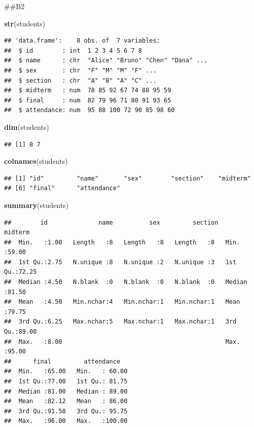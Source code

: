 \documentclass[
]{article}
\newenvironment{Shaded}{\begin{snugshade}}{\end{snugshade}}
\newcommand{\FunctionTok}[1]{\textcolor[rgb]{0.13,0.29,0.53}{\textbf{#1}}}
\newcommand{\NormalTok}[1]{#1}
\begin{document}
\#\#B2

\begin{Shaded}
\begin{Highlighting}[]
\FunctionTok{str}\NormalTok{(students)}
\end{Highlighting}
\end{Shaded}

\begin{verbatim}
## 'data.frame':    8 obs. of  7 variables:
##  $ id        : int  1 2 3 4 5 6 7 8
##  $ name      : chr  "Alice" "Bruno" "Chen" "Dana" ...
##  $ sex       : chr  "F" "M" "M" "F" ...
##  $ section   : chr  "A" "B" "A" "C" ...
##  $ midterm   : num  78 85 92 67 74 88 95 59
##  $ final     : num  82 79 96 71 80 91 93 65
##  $ attendance: num  95 88 100 72 90 85 98 60
\end{verbatim}

\begin{Shaded}
\begin{Highlighting}[]
\FunctionTok{dim}\NormalTok{(students)}
\end{Highlighting}
\end{Shaded}

\begin{verbatim}
## [1] 8 7
\end{verbatim}

\begin{Shaded}
\begin{Highlighting}[]
\FunctionTok{colnames}\NormalTok{(students)}
\end{Highlighting}
\end{Shaded}

\begin{verbatim}
## [1] "id"         "name"       "sex"        "section"    "midterm"   
## [6] "final"      "attendance"
\end{verbatim}

\begin{Shaded}
\begin{Highlighting}[]
\FunctionTok{summary}\NormalTok{(students)}
\end{Highlighting}
\end{Shaded}

\begin{verbatim}
##        id              name          sex         section     midterm     
##  Min.   :1.00   Length   :8   Length   :8   Length   :8   Min.   :59.00  
##  1st Qu.:2.75   N.unique :8   N.unique :2   N.unique :3   1st Qu.:72.25  
##  Median :4.50   N.blank  :0   N.blank  :0   N.blank  :0   Median :81.50  
##  Mean   :4.50   Min.nchar:4   Min.nchar:1   Min.nchar:1   Mean   :79.75  
##  3rd Qu.:6.25   Max.nchar:5   Max.nchar:1   Max.nchar:1   3rd Qu.:89.00  
##  Max.   :8.00                                             Max.   :95.00  
##      final         attendance    
##  Min.   :65.00   Min.   : 60.00  
##  1st Qu.:77.00   1st Qu.: 81.75  
##  Median :81.00   Median : 89.00  
##  Mean   :82.12   Mean   : 86.00  
##  3rd Qu.:91.50   3rd Qu.: 95.75  
##  Max.   :96.00   Max.   :100.00
\end{verbatim}
\end{document}
